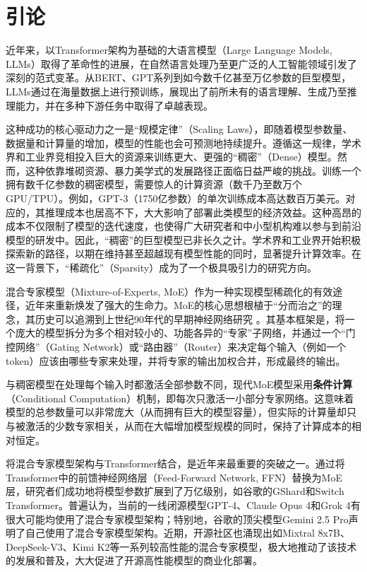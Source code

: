 \chapter{引论}
\label{chap:introduction}

近年来，以Transformer架构为基础的大语言模型（Large Language Models, LLMs）取得了革命性的进展，在自然语言处理乃至更广泛的人工智能领域引发了深刻的范式变革。从BERT\cite{Devlin2019BERTPO}、GPT\cite{Radford2018ImprovingLU}系列到如今数千亿甚至万亿参数的巨型模型，LLMs通过在海量数据上进行预训练，展现出了前所未有的语言理解、生成乃至推理能力，并在多种下游任务中取得了卓越表现。

这种成功的核心驱动力之一是“规模定律”（Scaling Laws），即随着模型参数量、数据量和计算量的增加，模型的性能也会可预测地持续提升\cite{Kaplan2020ScalingLF}。遵循这一规律，学术界和工业界竞相投入巨大的资源来训练更大、更强的“稠密”（Dense）模型。然而，这种依靠堆砌资源、暴力美学式的发展路径正面临日益严峻的挑战。训练一个拥有数千亿参数的稠密模型，需要惊人的计算资源（数千乃至数万个GPU/TPU）。例如，GPT-3\cite{Brown2020LanguageMA}（1750亿参数）的单次训练成本高达数百万美元\cite{lambdaai2020demystifyinggpt3}。对应的，其推理成本也居高不下，大大影响了部署此类模型的经济效益\cite{Erdil2025InferenceEO}。这种高昂的成本不仅限制了模型的迭代速度，也使得广大研究者和中小型机构难以参与到前沿模型的研发中。因此，“稠密”的巨型模型已非长久之计。学术界和工业界开始积极探索新的路径，以期在维持甚至超越现有模型性能的同时，显著提升计算效率。在这一背景下，“稀疏化”（Sparsity）成为了一个极具吸引力的研究方向。

混合专家模型（Mixture-of-Experts, MoE）\cite{Jacobs1991AdaptiveMO}作为一种实现模型稀疏化的有效途径，近年来重新焕发了强大的生命力。MoE的核心思想根植于“分而治之”的理念，其历史可以追溯到上世纪90年代的早期神经网络研究 \cite{Jacobs1991AdaptiveMO,Jordan1993HierarchicalMO}。其基本框架是，将一个庞大的模型拆分为多个相对较小的、功能各异的“专家”子网络，并通过一个“门控网络”（Gating Network）或“路由器”（Router）来决定每个输入（例如一个token）应该由哪些专家来处理，并将专家的输出加权合并，形成最终的输出。

与稠密模型在处理每个输入时都激活全部参数不同，现代MoE模型采用\textbf{条件计算}（Conditional Computation）机制，即每次只激活一小部分专家网络。这意味着模型的总参数量可以非常庞大（从而拥有巨大的模型容量），但实际的计算量却只与被激活的少数专家相关，从而在大幅增加模型规模的同时，保持了计算成本的相对恒定\cite{Shazeer2017OutrageouslyLN}。

将混合专家模型架构与Transformer结合，是近年来最重要的突破之一。通过将Transformer中的前馈神经网络层（Feed-Forward Network, FFN）替换为MoE层，研究者们成功地将模型参数扩展到了万亿级别，如谷歌的GShard\cite{Lepikhin2020GShardSG}和Switch Transformer\cite{Fedus2021SwitchTS}。普遍认为，当前的一线闭源模型GPT-4\cite{Achiam2023GPT4TR}、Claude Opus 4\cite{anthropic2024claude4}和Grok 4\cite{xai2025grok4}有很大可能均使用了混合专家模型架构；特别地，谷歌的顶尖模型Gemini 2.5 Pro\cite{comanici2025gemini25pushingfrontier}声明了自己使用了混合专家模型架构。近期，开源社区也涌现出如Mixtral 8x7B\cite{Jiang2024MixtralOE}、DeepSeek-V3\cite{DeepSeekAI2024DeepSeekV3TR}、Kimi K2\cite{Bai2025KimiKO}等一系列较高性能的混合专家模型，极大地推动了该技术的发展和普及，大大促进了开源高性能模型的商业化部署。

